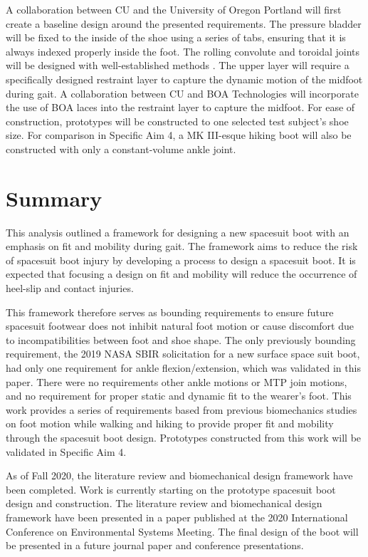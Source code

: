 \documentclass[defaultstyle,11pt]{comps}
\begin{document}
A collaboration between CU and the University of Oregon Portland will first create a baseline design around the presented requirements.
The pressure bladder will be fixed to the inside of the shoe using a series of tabs, ensuring that it is always indexed properly inside the foot.
The rolling convolute and toroidal joints will be designed with well-established methods \citep{Harris2001}.
The upper layer will require a specifically designed restraint layer to capture the dynamic motion of the midfoot during gait.
A collaboration between CU and BOA Technologies will incorporate the use of BOA laces into the restraint layer to capture the midfoot.
For ease of construction, prototypes will be constructed to one selected test subject's shoe size.
For comparison in Specific Aim 4, a MK III-esque hiking boot will also be constructed with only a constant-volume ankle joint.

\hypertarget{summary-3}{%
\section{Summary}\label{summary-3}}

This analysis outlined a framework for designing a new spacesuit boot with an emphasis on fit and mobility during gait.
The framework aims to reduce the risk of spacesuit boot injury by developing a process to design a spacesuit boot.
It is expected that focusing a design on fit and mobility will reduce the occurrence of heel-slip and contact injuries.

This framework therefore serves as bounding requirements to ensure future spacesuit footwear does not inhibit natural foot motion or cause discomfort due to incompatibilities between foot and shoe shape.
The only previously bounding requirement, the 2019 NASA SBIR solicitation for a new surface space suit boot, had only one requirement for ankle flexion/extension, which was validated in this paper.
There were no requirements other ankle motions or MTP join motions, and no requirement for proper static and dynamic fit to the wearer's foot.
This work provides a series of requirements based from previous biomechanics studies on foot motion while walking and hiking to provide proper fit and mobility through the spacesuit boot design.
Prototypes constructed from this work will be validated in Specific Aim 4.

As of Fall 2020, the literature review and biomechanical design framework have been completed.
Work is currently starting on the prototype spacesuit boot design and construction.
The literature review and biomechanical design framework have been presented in a paper published at the 2020 International Conference on Environmental Systems Meeting.
The final design of the boot will be presented in a future journal paper and conference presentations.
\end{document}
